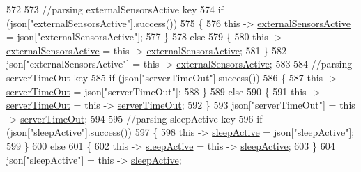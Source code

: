 \begin{DoxyCode}
572 
573             \textcolor{comment}{//parsing externalSensorsActive key}
574             \textcolor{keywordflow}{if} (json[\textcolor{stringliteral}{"externalSensorsActive"}].success())
575             \{
576                 \textcolor{keyword}{this} -> \hyperlink{classCoolBoard_a638b00b76aeb819ecfd4c10b8cdd7bb7}{externalSensorsActive} = json[\textcolor{stringliteral}{"externalSensorsActive"}];
577             \}
578             \textcolor{keywordflow}{else}
579             \{
580                 \textcolor{keyword}{this} -> \hyperlink{classCoolBoard_a638b00b76aeb819ecfd4c10b8cdd7bb7}{externalSensorsActive} = \textcolor{keyword}{this} -> 
      \hyperlink{classCoolBoard_a638b00b76aeb819ecfd4c10b8cdd7bb7}{externalSensorsActive};
581             \}
582             json[\textcolor{stringliteral}{"externalSensorsActive"}] = \textcolor{keyword}{this} -> \hyperlink{classCoolBoard_a638b00b76aeb819ecfd4c10b8cdd7bb7}{externalSensorsActive};
583 
584             \textcolor{comment}{//parsing serverTimeOut key}
585             \textcolor{keywordflow}{if} (json[\textcolor{stringliteral}{"serverTimeOut"}].success())
586             \{
587                 \textcolor{keyword}{this} -> \hyperlink{classCoolBoard_a7a8d8d3d316220cdd049cd63c1aa8fe6}{serverTimeOut} = json[\textcolor{stringliteral}{"serverTimeOut"}];
588             \}
589             \textcolor{keywordflow}{else}
590             \{
591                 \textcolor{keyword}{this} -> \hyperlink{classCoolBoard_a7a8d8d3d316220cdd049cd63c1aa8fe6}{serverTimeOut} = \textcolor{keyword}{this} -> \hyperlink{classCoolBoard_a7a8d8d3d316220cdd049cd63c1aa8fe6}{serverTimeOut};
592             \}
593             json[\textcolor{stringliteral}{"serverTimeOut"}] = \textcolor{keyword}{this} -> \hyperlink{classCoolBoard_a7a8d8d3d316220cdd049cd63c1aa8fe6}{serverTimeOut};
594             
595             \textcolor{comment}{//parsing sleepActive key}
596             \textcolor{keywordflow}{if} (json[\textcolor{stringliteral}{"sleepActive"}].success())
597             \{
598                 \textcolor{keyword}{this} -> \hyperlink{classCoolBoard_a0a51b2287139f66c738101fb53139230}{sleepActive} = json[\textcolor{stringliteral}{"sleepActive"}];
599             \}
600             \textcolor{keywordflow}{else}
601             \{
602                 \textcolor{keyword}{this} -> \hyperlink{classCoolBoard_a0a51b2287139f66c738101fb53139230}{sleepActive} = \textcolor{keyword}{this} -> \hyperlink{classCoolBoard_a0a51b2287139f66c738101fb53139230}{sleepActive};
603             \}
604             json[\textcolor{stringliteral}{"sleepActive"}] = \textcolor{keyword}{this} -> \hyperlink{classCoolBoard_a0a51b2287139f66c738101fb53139230}{sleepActive};

\end{DoxyCode}
